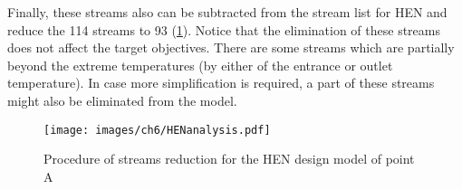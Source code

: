  Finally, these streams also can be subtracted from the stream list for HEN and reduce the 114 streams to 93 (\cref{fig6:HENanalysis}). Notice that the elimination of these streams does not affect the target objectives. There are some streams which are partially beyond the extreme temperatures (by either of the entrance or outlet temperature). In case more simplification is required, a part of these streams might also be eliminated from the model.

        
           \begin{figure}[!ht!]
             \vspace*{2mm}
            \begin{center}
            \texttt{[image: images/ch6/HENanalysis.pdf]} \vspace*{0mm}
            \caption{Procedure of streams reduction for the HEN design model of point A} \vspace*{-5mm}
            \label{fig6:HENanalysis}
            \end{center}
            \end{figure} 
